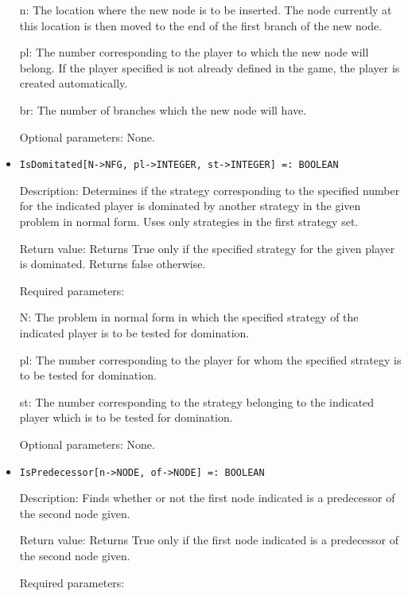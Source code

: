 \begin{itemize}
\bd
\item
[ n:] The location where the new node is to be inserted.  The node
currently at this location is then moved to the end of the first
branch of the new node.
\item
[ pl:] The number corresponding to the player to which the new node
will belong.  If the player specified is not already defined in	the
game, the player is created automatically.
\item
[ br:] The number of branches which the new node will have.
\ed

\item
[Optional parameters:] None.
\ed

\item
\protect \large \begin{verbatim}
IsDomitated[N->NFG, pl->INTEGER, st->INTEGER] =: BOOLEAN
\end{verbatim}\normalsize

\bd
\item
[Description:] Determines if the strategy corresponding to the specified
number for the indicated player is dominated by another strategy in the
given problem in normal form.  Uses only strategies in the first 
strategy set.
\item
[Return value:] Returns True only if the specified strategy for the 
given player is dominated.  Returns false otherwise.
\item
[Required parameters:]\hfil\null

\bd
\item
[ N:] The problem in normal form in which the specified strategy of
the indicated player is to be tested for domination.
\item
[ pl:] The number corresponding to the player for whom the specified
strategy is to be tested for domination.
\item
[ st:] The number corresponding to the strategy belonging to the 
indicated player which is to be tested for domination.
\ed

\item
[Optional parameters:] None.
\ed

\item
\protect \large \begin{verbatim}
IsPredecessor[n->NODE, of->NODE] =: BOOLEAN
\end{verbatim}\normalsize

\bd
\item
[Description:] Finds whether or not the first node indicated is a 
predecessor of the second node given.
\item
[Return value:] Returns True only if the first node indicated is a
predecessor of the second node given.
\item
[Required parameters:]\hfil\null


\end{itemize}
